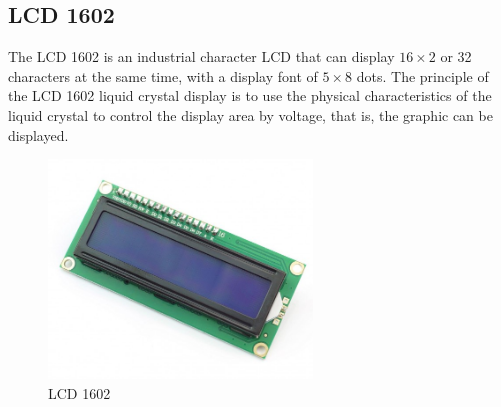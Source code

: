 \documentclass[a4paper, 12pt]{article}
\begin{document}
\newpage

\subsection{LCD 1602}
The LCD 1602\cite{lcd, i2cLcd} is an industrial character LCD that can display $16 \times 2$ or 32 characters at the same time, with a display font of $5 \times 8$ dots. The principle of the LCD 1602 liquid crystal display is to use the physical characteristics of the liquid crystal to control the display area by voltage,
that is, the graphic can be displayed.
\begin{figure}[h]
    \includegraphics[width=7cm]{lcd}
    \centering
    \caption{LCD 1602}
\end{figure}
\end{document}
